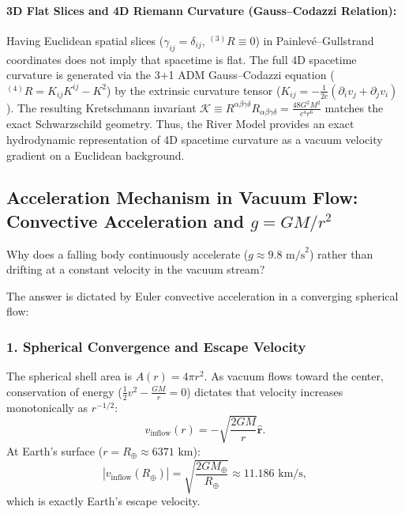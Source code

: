 \paragraph{3D Flat Slices and 4D Riemann Curvature (Gauss--Codazzi Relation):}
Having Euclidean spatial slices ($\gamma_{ij} = \delta_{ij}$, $^{(3)}R \equiv 0$) in Painlevé--Gullstrand coordinates does not imply that spacetime is flat. The full 4D spacetime curvature is generated via the 3+1 ADM Gauss--Codazzi equation ($^{(4)}R = K_{ij}K^{ij} - K^2$) by the extrinsic curvature tensor ($K_{ij} = -\frac{1}{2c}(\partial_i v_j + \partial_j v_i)$). The resulting Kretschmann invariant $\mathcal{K} \equiv R^{\alpha\beta\gamma\delta} R_{\alpha\beta\gamma\delta} = \frac{48 G^2 M^2}{c^4 r^6}$ matches the exact Schwarzschild geometry. Thus, the River Model provides an exact hydrodynamic representation of 4D spacetime curvature as a vacuum velocity gradient on a Euclidean background.

\subsection{Acceleration Mechanism in Vacuum Flow: Convective Acceleration and $g = GM/r^2$}
\label{sec:ivmelenme_ispat}

Why does a falling body continuously accelerate ($g \approx 9.8\text{ m/s}^2$) rather than drifting at a constant velocity in the vacuum stream?

The answer is dictated by Euler convective acceleration in a converging spherical flow:

\subsubsection{1. Spherical Convergence and Escape Velocity}
The spherical shell area is $A(r) = 4\pi r^2$. As vacuum flows toward the center, conservation of energy ($\frac{1}{2} v^2 - \frac{GM}{r} = 0$) dictates that velocity increases monotonically as $r^{-1/2}$:
\begin{equation}
    v_{\mathrm{inflow}}(r) = -\sqrt{\frac{2GM}{r}} \hat{\mathbf{r}}.
\end{equation}
At Earth's surface ($r = R_\oplus \approx 6371\text{ km}$):
\begin{equation}
    |v_{\mathrm{inflow}}(R_\oplus)| = \sqrt{\frac{2GM_\oplus}{R_\oplus}} \approx 11.186\text{ km/s},
\end{equation}
which is exactly Earth's escape velocity.

